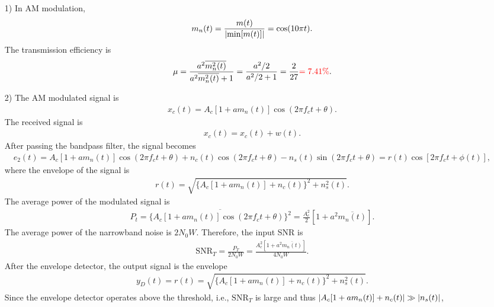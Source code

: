 \documentclass{assignment}
\begin{document}
\begin{sol}
    \begin{itemize}
        \item[1)] In AM modulation,
        \begin{align}
            m_n(t)=\frac{m(t)}{\left\lvert\min[m(t)]\right\rvert}=\cos(10\pi t).
        \end{align}
        The transmission efficiency is
        \begin{align}
            \mu=\frac{a^2\overline{m_n^2(t)}}{a^2\overline{m_n^2(t)}+1}=\frac{a^2/2}{a^2/2+1}=\frac{2}{27}{\color{red}=7.41\%}.
        \end{align}
        \item[2)] The AM modulated signal is
        \begin{align}
            x_c(t)=A_c[1+am_n(t)]\cos(2\pi f_ct+\theta).
        \end{align}
        The received signal is
        \begin{align}
            x_c(t)=x_c(t)+w(t).
        \end{align}
        After passing the bandpass filter, the signal becomes
        \begin{align}
            e_2(t)=A_c[1+am_n(t)]\cos(2\pi f_ct+\theta)+n_c(t)\cos(2\pi f_ct+\theta)-n_s(t)\sin(2\pi f_ct+\theta)=r(t)\cos[2\pi f_ct+\phi(t)],
        \end{align}
        where the envelope of the signal is
        \begin{align}
            r(t)=\sqrt{\{A_c[1+am_n(t)]+n_c(t)\}^2+n_s^2(t)}.
        \end{align}
        The average power of the modulated signal is
        \begin{align}
            P_t=\overline{\{A_c[1+am_n(t)]\cos(2\pi f_ct+\theta)\}^2}=\frac{A_c^2}{2}\left[1+a^2\overline{m_n(t)}\right].
        \end{align}
        The average power of the narrowband noise is $2N_0W$. Therefore, the input SNR is
        \begin{align}
            \text{SNR}_T=\frac{P_T}{2N_0W}=\frac{A_c^2\left[1+a^2\overline{m_n(t)}\right]}{4N_0W}.
        \end{align}
        After the envelope detector, the output signal is the envelope
        \begin{align}
            y_D(t)=r(t)=\sqrt{\{A_c[1+am_n(t)]+n_c(t)\}^2+n_s^2(t)}.
        \end{align}
        Since the envelope detector operates above the threshold, i.e., $\text{SNR}_T$ is large and thus $\left\lvert A_c[1+am_n(t)]+n_c(t)\right\rvert\gg\left\lvert n_s(t)\right\rvert$,

\end{itemize}
\end{sol}
\end{document}
